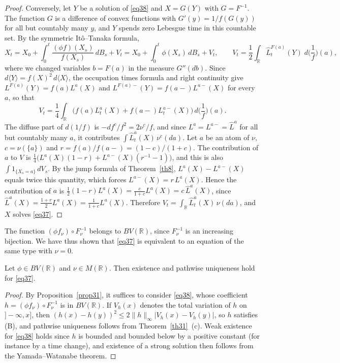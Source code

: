 \begin{proof}
	Conversely, let $Y$ be a solution of \eqref{eq38} and $X = G(Y)$ with
	$G = F^{-1}$. The function $G$ is a difference of convex functions with
	$G'(y) = 1/f(G(y))$ for all but countably many $y$, and $Y$ spends zero Lebesgue
	time in this countable set. By the symmetric It\^o--Tanaka formula,
	\[
		X_t = X_0 + \int_0^t \frac{(\phi f)(X_s)}{f(X_s)}\,dB_s + V_t = X_0 + \int_0^t \phi(X_s)\,dB_s + V_t,
		\qquad V_t = \frac{1}{2}\int_\mathbb{R} \hat{L}_t^{F(a)}(Y)\; d\Big(\frac{1}{f}\Big)(a),
	\]
	where we changed variables $b = F(a)$ in the measure $G''(db)$. Since
	$d\langle Y\rangle = f(X)^2\,d\langle X\rangle$, the occupation times formula and right
	continuity give $L^{F(a)}(Y) = f(a)L^a(X)$ and $L^{F(a)-}(Y) = f(a-)L^{a-}(X)$ for
	every $a$, so that
	\[
		V_t = \frac{1}{4}\int_\mathbb{R} \big(f(a)L^a_t(X) + f(a-)L^{a-}_t(X)\big)\, d\Big(\frac{1}{f}\Big)(a) .
	\]
	The diffuse part of $d(1/f)$ is $-df^c/f^2 = 2\nu^c/f$, and since $L^a = L^{a-} = \hat{L}^a$
	for all but countably many $a$, it contributes $\int \hat{L}^a_t(X)\,\nu^c(da)$. Let $a$
	be an atom of $\nu$, $c = \nu(\{a\})$ and $r = f(a)/f(a-) = (1-c)/(1+c)$. The
	contribution of $a$ to $V$ is
	$\frac{1}{4}\big(L^a(X)(1-r) + L^{a-}(X)(r^{-1}-1)\big)$, and this is also
	$\int 1_{\{X_s = a\}}\,dV_s$. By the jump formula of Theorem~\ref{th8},
	$L^a(X) - L^{a-}(X)$ equals twice this quantity, which forces
	$L^{a-}(X) = r\,L^a(X)$. Hence the contribution of $a$ is
	$\frac{1}{2}(1-r)L^a(X) = \frac{c}{1+c}L^a(X) = c\,\hat{L}^a(X)$, since
	$\hat{L}^a(X) = \frac{1+r}{2}L^a(X) = \frac{1}{1+c}L^a(X)$. Therefore
	$V_t = \int_\mathbb{R}\hat{L}^a_t(X)\,\nu(da)$, and $X$ solves \eqref{eq37}.
\end{proof}

The function $(\phi f_\nu)\circ F_{\nu}^{-1}$ belongs to $BV(\mathbb{R})$, since
$F_\nu^{-1}$ is an increasing bijection. We have thus shown that
\eqref{eq37} is equivalent to an equation of the same type with $\nu=0$.

\begin{theorem}\label{th:singular}
	Let $\phi\in BV(\mathbb{R})$ and $\nu\in M(\mathbb{R})$. Then existence and
	pathwise uniqueness hold for \eqref{eq37}.
\end{theorem}

\begin{proof}
	By Proposition~\ref{prop31}, it suffices to consider \eqref{eq38}, whose
	coefficient $h = (\phi f_\nu)\circ F_{\nu}^{-1}$ is in $BV(\mathbb{R})$. If
	$V_h(x)$ denotes the total variation of $h$ on $]-\infty,x]$, then
	$(h(x)-h(y))^2 \leqslant 2\|h\|_\infty |V_h(x) - V_h(y)|$, so $h$ satisfies (B),
	and pathwise uniqueness follows from Theorem~\ref{th31}~(c). Weak existence for
	\eqref{eq38} holds since $h$ is bounded and bounded below by a positive constant
	(for instance by a time change), and existence of a strong solution then follows
	from the Yamada--Watanabe theorem.
\end{proof}

